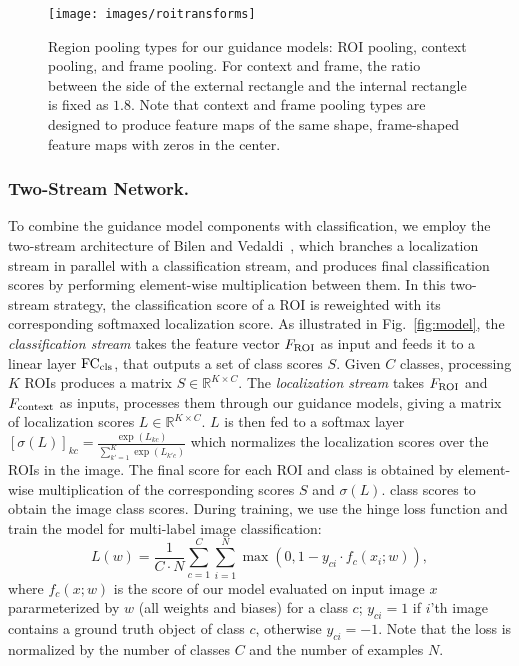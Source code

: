 \documentclass[runningheads]{llncs}
\begin{document}
\begin{figure}[t] \texttt{[image: images/roitransforms]} \caption[small]{Region pooling types for our guidance models: ROI pooling, context pooling, and frame pooling. For context and frame, the ratio between the side of the external rectangle and the internal rectangle is fixed as 
$1.8$. Note that context and frame pooling types are designed to produce feature maps of the same shape, \ie frame-shaped feature maps with zeros in the center.} \label{fig:roitransforms} \end{figure}\subsubsection{Two-Stream Network.} To combine the guidance model components
with classification, we employ the two-stream architecture of Bilen and
Vedaldi~\cite{Bilen:2015uo}, which branches a localization stream in parallel
with a classification stream, and produces final classification scores by
performing element-wise multiplication between them. In this two-stream strategy, the
classification score of a ROI is reweighted with its corresponding softmaxed
localization score. As illustrated in Fig.~\ref{fig:model}, the {\em classification stream} takes the feature vector  
$F_{\rm ROI}$ as input and feeds it to a linear layer ${\rm FC_{cls}}$, that outputs a set of class
scores $S$. Given $C$ classes, processing $K$ ROIs produces a matrix $S \in \mathbb{R}^{K \times C}$. The {\em localization stream} takes $F_{\rm ROI}$ and $F_{\rm context}$ as inputs, processes them through our guidance models, giving a matrix of localization
scores $L \in \mathbb{R}^{K \times C}$. $L$ is then fed to a softmax layer $ [ \sigma(L) ]_{kc} = \frac{\exp(L_{kc})}{\sum_{k'=1}^{K}{\exp(L_{k'c})}}$ which normalizes the localization scores over the ROIs in the image. 
The final score for each ROI and class is obtained by element-wise multiplication of the corresponding scores $S$ and $\sigma(L)$. 
class scores to obtain the image class scores. During training, we use the hinge
loss function and train the model for multi-label image classification: $$L(w) =
\frac{1}{C \cdot N}\sum_{c=1}^{C}\sum_{i=1}^{N}\max(0, 1 - y_{ci} \cdot f_c(x_i;
w)),$$ where $f_c(x; w)$ is the score of our model evaluated on input image $x$
pararmeterized by $w$ (all weights and biases) for a class $c$; $y_{ci} = 1$ if
$i$'th image contains a ground truth object of class $c$, otherwise $y_{ci} =
-1$. Note that the loss is normalized by the number of classes $C$ and the
number of examples $N$. 
\end{document}
